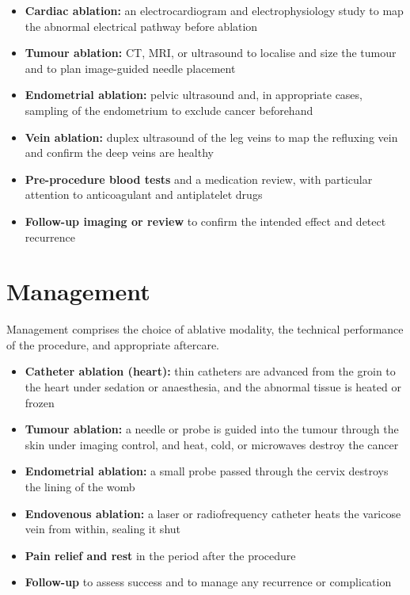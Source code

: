 \begin{itemize}
    \item \textbf{Cardiac ablation:} an electrocardiogram and electrophysiology study to map the abnormal electrical pathway before ablation
    \item \textbf{Tumour ablation:} CT, MRI, or ultrasound to localise and size the tumour and to plan image-guided needle placement
    \item \textbf{Endometrial ablation:} pelvic ultrasound and, in appropriate cases, sampling of the endometrium to exclude cancer beforehand
    \item \textbf{Vein ablation:} duplex ultrasound of the leg veins to map the refluxing vein and confirm the deep veins are healthy
    \item \textbf{Pre-procedure blood tests} and a medication review, with particular attention to anticoagulant and antiplatelet drugs
    \item \textbf{Follow-up imaging or review} to confirm the intended effect and detect recurrence
\end{itemize}

\section*{Management}
Management comprises the choice of ablative modality, the technical performance of the procedure, and appropriate aftercare.

\begin{itemize}
    \item \textbf{Catheter ablation (heart):} thin catheters are advanced from the groin to the heart under sedation or anaesthesia, and the abnormal tissue is heated or frozen
    \item \textbf{Tumour ablation:} a needle or probe is guided into the tumour through the skin under imaging control, and heat, cold, or microwaves destroy the cancer
    \item \textbf{Endometrial ablation:} a small probe passed through the cervix destroys the lining of the womb
    \item \textbf{Endovenous ablation:} a laser or radiofrequency catheter heats the varicose vein from within, sealing it shut
    \item \textbf{Pain relief and rest} in the period after the procedure
    \item \textbf{Follow-up} to assess success and to manage any recurrence or complication
\end{itemize}

